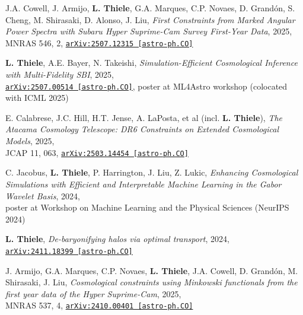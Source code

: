 \begin{minipage}{\textwidth}
J.A. Cowell, J. Armijo, {\bf L. Thiele}, G.A. Marques, C.P. Novaes, D. Grand\'on, S. Cheng,
M. Shirasaki, D. Alonso, J. Liu,
\emph{First Constraints from Marked Angular Power Spectra with Subaru Hyper Suprime-Cam Survey First-Year Data}, 2025,\\
MNRAS 546, 2,
\href{https://arxiv.org/abs/2507.12315}{\mbox{\texttt{arXiv:2507.12315 [astro-ph.CO]}}}
\end{minipage}

\begin{minipage}{\textwidth}
{\bf L. Thiele}, A.E. Bayer, N. Takeishi,
\emph{Simulation-Efficient Cosmological Inference with Multi-Fidelity SBI}, 2025,\\
\href{https://arxiv.org/abs/2507.00514}{\mbox{\texttt{arXiv:2507.00514 [astro-ph.CO]}}},
poster at ML4Astro workshop (colocated with ICML 2025)
\end{minipage}

\begin{minipage}{\textwidth}
E. Calabrese, J.C. Hill, H.T. Jense, A. LaPosta, et al (incl. {\bf L. Thiele}),
\emph{The Atacama Cosmology Telescope: DR6 Constraints on Extended Cosmological Models}, 2025,\\
JCAP 11, 063,
\href{http://arxiv.org/abs/2503.14454}{\mbox{\texttt{arXiv:2503.14454 [astro-ph.CO]}}}
\end{minipage}

\begin{minipage}{\textwidth}
C. Jacobus, {\bf L. Thiele}, P. Harrington, J. Liu, Z. Lukic,
\emph{Enhancing Cosmological Simulations with Efficient and Interpretable Machine Learning
in the Gabor Wavelet Basis}, 2024,\\
poster at Workshop on Machine Learning and the Physical Sciences (NeurIPS 2024)
\end{minipage}

\begin{minipage}{\textwidth}
{\bf L. Thiele}, \emph{De-baryonifying halos via optimal transport}, 2024,\\
\href{http://arxiv.org/abs/2411.18399}{\mbox{\texttt{arXiv:2411.18399 [astro-ph.CO]}}}
\end{minipage}

\begin{minipage}{\textwidth}
J. Armijo, G.A. Marques, C.P. Novaes, {\bf L. Thiele}, J.A. Cowell, D. Grand\'on,
M. Shirasaki, J. Liu,
\emph{Cosmological constraints using Minkowski functionals from the first year
data of the Hyper Suprime-Cam}, 2025,\\
MNRAS 537, 4,
\href{https://arxiv.org/abs/2410.00401}{\mbox{\texttt{arXiv:2410.00401 [astro-ph.CO]}}}
\end{minipage}

